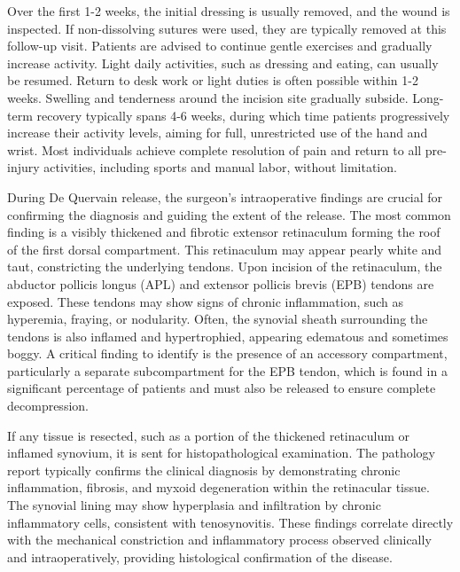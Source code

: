 Over the first 1-2 weeks, the initial dressing is usually removed, and the wound is inspected. If non-dissolving sutures were used, they are typically removed at this follow-up visit. Patients are advised to continue gentle exercises and gradually increase activity. Light daily activities, such as dressing and eating, can usually be resumed. Return to desk work or light duties is often possible within 1-2 weeks. Swelling and tenderness around the incision site gradually subside. Long-term recovery typically spans 4-6 weeks, during which time patients progressively increase their activity levels, aiming for full, unrestricted use of the hand and wrist. Most individuals achieve complete resolution of pain and return to all pre-injury activities, including sports and manual labor, without limitation.

During De Quervain release, the surgeon's intraoperative findings are crucial for confirming the diagnosis and guiding the extent of the release. The most common finding is a visibly thickened and fibrotic extensor retinaculum forming the roof of the first dorsal compartment. This retinaculum may appear pearly white and taut, constricting the underlying tendons. Upon incision of the retinaculum, the abductor pollicis longus (APL) and extensor pollicis brevis (EPB) tendons are exposed. These tendons may show signs of chronic inflammation, such as hyperemia, fraying, or nodularity. Often, the synovial sheath surrounding the tendons is also inflamed and hypertrophied, appearing edematous and sometimes boggy. A critical finding to identify is the presence of an accessory compartment, particularly a separate subcompartment for the EPB tendon, which is found in a significant percentage of patients and must also be released to ensure complete decompression.

If any tissue is resected, such as a portion of the thickened retinaculum or inflamed synovium, it is sent for histopathological examination. The pathology report typically confirms the clinical diagnosis by demonstrating chronic inflammation, fibrosis, and myxoid degeneration within the retinacular tissue. The synovial lining may show hyperplasia and infiltration by chronic inflammatory cells, consistent with tenosynovitis. These findings correlate directly with the mechanical constriction and inflammatory process observed clinically and intraoperatively, providing histological confirmation of the disease.

